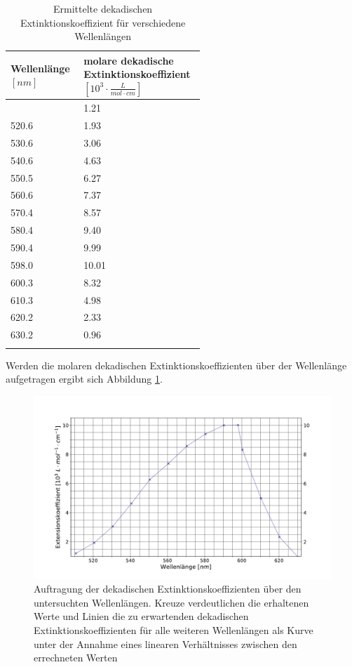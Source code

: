 \begin{table}[H]
	\centering
	\caption{Ermittelte dekadischen Extinktionskoeffizient für verschiedene Wellenlängen}
	\begin{tabular}{|C{0.25\linewidth}|C{0.3\linewidth}|}
		\hline \addlinespace[1ex] 
		Wellenlänge $[\si{nm}] $ &  molare dekadische Extinktionskoeffizient $\left[ 10^{3} \cdot \si{\frac{L}{mol\cdot cm}}\right]$  \\
		\hline {} & 1.21 \\
		520.6 &1.93\\
		530.6 &3.06\\
		540.6  &4.63\\
		550.5 & 6.27 \\
		560.6 &7.37\\
		570.4 &8.57\\
		580.4  &9.40\\		
		590.4 & 9.99 \\
		598.0 &10.01\\
		600.3 &8.32\\
		610.3 &4.98\\
		620.2  &2.33\\
		630.2 & 0.96 \\
		\hline \addlinespace[1ex]  
	\end{tabular}
	\label{tab:ExtKoeff}
\end{table}
Werden die molaren dekadischen Extinktionskoeffizienten über der Wellenlänge aufgetragen ergibt sich Abbildung \ref{fig:ExtKoeffs}.
\begin{figure}[H]
	\centering	
	\begin{minipage}{1\textwidth}
		\includegraphics[width=\columnwidth]{Rohdaten/Extkoeff.pdf}	
		\caption{Auftragung der dekadischen Extinktionskoeffizienten über den untersuchten Wellenlängen. Kreuze verdeutlichen die erhaltenen Werte und Linien die zu erwartenden dekadischen Extinktionskoeffizienten für alle weiteren Wellenlängen als Kurve unter der Annahme eines linearen Verhältnisses zwischen den errechneten Werten}
		\label{fig:ExtKoeffs}
	\end{minipage}
\end{figure}
